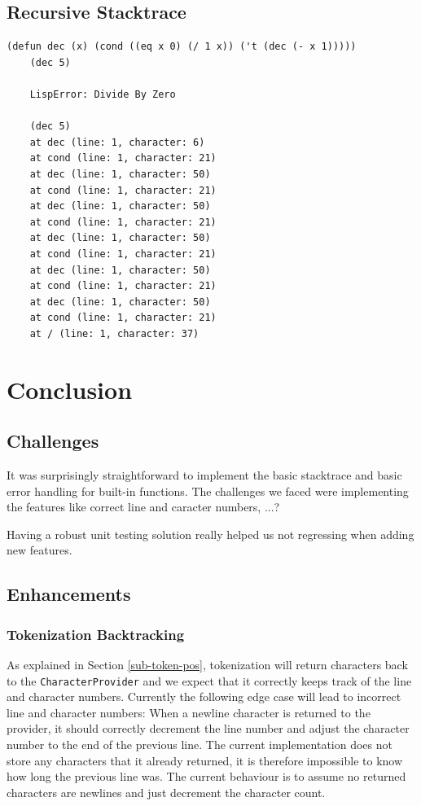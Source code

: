 \documentclass[a4paper,titlepage]{article}
\numberwithin{equation}{section} %
\begin{document}
	
	\newpage
	\subsection{Recursive Stacktrace}
	\begin{lstlisting}[]
	(defun dec (x) (cond ((eq x 0) (/ 1 x)) ('t (dec (- x 1)))))
	(dec 5)
	
	LispError: Divide By Zero
	
	(dec 5)
	at dec (line: 1, character: 6)
	at cond (line: 1, character: 21)
	at dec (line: 1, character: 50)
	at cond (line: 1, character: 21)
	at dec (line: 1, character: 50)
	at cond (line: 1, character: 21)
	at dec (line: 1, character: 50)
	at cond (line: 1, character: 21)
	at dec (line: 1, character: 50)
	at cond (line: 1, character: 21)
	at dec (line: 1, character: 50)
	at cond (line: 1, character: 21)
	at / (line: 1, character: 37)
	\end{lstlisting}
	\newpage
	
	
	\section{Conclusion}
	\subsection{Challenges}
	It was surprisingly straightforward to implement the basic stacktrace and basic error handling for built-in functions. The challenges we faced were implementing the features like correct line and caracter numbers, ...?
	
	Having a robust unit testing solution really helped us not regressing when adding new features.
	
	
	\subsection{Enhancements}
	
	\subsubsection*{Tokenization Backtracking}
	As explained in Section \ref{sub-token-pos}, tokenization will return characters back to the \texttt{CharacterProvider} and we expect that it correctly keeps track of the line and character numbers. Currently the following edge case will lead to incorrect line and character numbers: When a newline character is returned to the provider, it should correctly decrement the line number and adjust the character number to the end of the previous line. The current implementation does not store any characters that it already returned, it is therefore impossible to know how long the previous line was. The current behaviour is to assume no returned characters are newlines and just decrement the character count.
	
\end{document}
